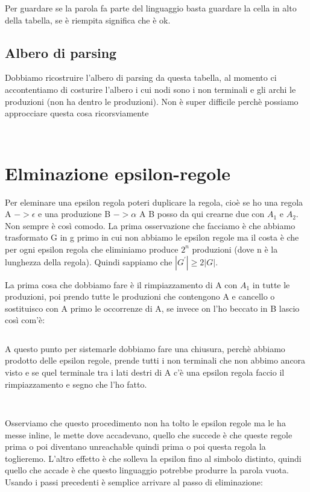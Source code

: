 Per guardare se la parola fa parte del linguaggio basta guardare la cella in alto della tabella, se è riempita significa che è ok.
\subsection{Albero di parsing}
Dobbiamo ricostruire l'albero di parsing da questa tabella, al momento ci accontentiamo di costurire l'albero i cui nodi sono i non terminali e gli archi le produzioni (non ha dentro le produzioni). Non è super difficile perchè possiamo approcciare questa cosa ricorsviamente

\begin{lstlisting}
    
\end{lstlisting}

\section{Elminazione epsilon-regole}
Per eleminare una epsilon regola poteri duplicare la regola, cioè se ho una regola A $ -> \epsilon$ e una produzione B $-> \alpha$ A B posso da qui crearne due con $A_1$ e $A_2$. Non sempre è così comodo. La prima osservazione che facciamo è che abbiamo trasformato G in g primo in cui non abbiamo le epsilon regole ma il costa è che per ogni epsilon regola che eliminiamo produce $2^n$ produzioni (dove n è la lunghezza della regola). Quindi sappiamo che $|G^{'}| \ge 2|G|$.

La prima cosa che dobbiamo fare è il rimpiazzamento di A con $A_1$ in tutte le produzioni, poi prendo tutte le produzioni che contengono A e cancello o sostituisco con A primo le occorrenze di A, se invece on l'ho beccato in B lascio così com'è:
\begin{lstlisting}

\end{lstlisting}

A questo punto per sistemarle dobbiamo fare una chiusura, perchè abbiamo prodotto delle epsilon regole, prende tutti i non terminali che non abbimo ancora visto e se quel terminale tra i lati destri di A c'è una epsilon regola faccio il rimpiazzamento e segno che l'ho fatto.
\begin{lstlisting}
  
\end{lstlisting}

Osserviamo che questo procedimento non ha tolto le epsilon regole ma le ha messe inline, le mette dove accadevano, quello che succede è che queste regole prima o poi diventano unreachable quindi prima o poi questa regola la toglieremo. L'altro effetto è che solleva la epsilon fino al simbolo distinto, quindi quello che accade è che questo linguaggio potrebbe produrre la parola vuota.
Usando i passi precedenti è semplice arrivare al passo di eliminazione:
\begin{lstlisting}
  
\end{lstlisting}


